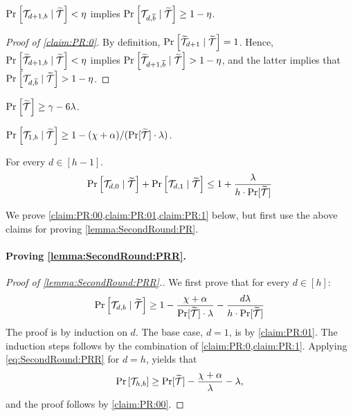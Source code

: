\begin{claim}\label{claim:PR:0}
	$\Pr_{}\left[\mathcal{T}_{d+1,b} \mid {\widetilde{\mathcal{T}}}\right] < \eta$ implies $\Pr_{}\left[\mathcal{T}_{d,\overline{b}} \mid {\widetilde{\mathcal{T}}}\right] \ge 1- \eta$.
\end{claim}
\begin{proof}[Proof of \cref{claim:PR:0}]
By definition, $\Pr_{}\left[{\widetilde{\mathcal{T}}}_{d+1} \mid {\widetilde{\mathcal{T}}}\right] =1$.	 Hence, $\Pr_{}\left[{\widetilde{\mathcal{T}}}_{d+1,b} \mid {\widetilde{\mathcal{T}}}\right]< \eta$ implies $\Pr_{}\left[{\widetilde{\mathcal{T}}}_{d+1,\overline{b}} \mid {\widetilde{\mathcal{T}}}\right]> 1 -\eta$, and the latter implies that $\Pr_{}\left[\mathcal{T}_{d,\overline{b}} \mid {\widetilde{\mathcal{T}}}\right]>  1 -\eta$.
\end{proof}


\begin{claim}\label{claim:PR:00}
$\Pr_{}\left[{\widetilde{\mathcal{T}}}\right] \ge \gamma- 6\lambda$.
\end{claim}


\begin{claim}\label{claim:PR:01}
$\Pr_{}\left[\mathcal{T}_{1,b} \mid {\widetilde{\mathcal{T}}}\right] \ge 1- (\chi + \alpha)/(\Pr[{\widetilde{\mathcal{T}}}]\cdot \lambda)$.
\end{claim}





\begin{claim}\label{claim:PR:1}
For every $d \in [h-1]$.
\[
\Pr_{}\left[\mathcal{T}_{d,0} \mid {\widetilde{\mathcal{T}}}\right] + \Pr_{}\left[\mathcal{T}_{d,1} \mid {\widetilde{\mathcal{T}}}\right] \le 1 + \frac{\lambda}{h\cdot\Pr[{\widetilde{\mathcal{T}}}]}
\]
\end{claim}

We prove \cref{claim:PR:00,claim:PR:01,claim:PR:1} below, but first use the above claims for proving \cref{lemma:SecondRound:PR}.


\paragraph{Proving \cref{lemma:SecondRound:PRR}.}


\begin{proof}[Proof of \cref{lemma:SecondRound:PRR}.]
We first prove that for every $d\in [h]$:
\begin{align}\label{eq:SecondRound:PRR}
\Pr_{}\left[\mathcal{T}_{d,b} \mid {\widetilde{\mathcal{T}}}\right] \ge 1- \frac{ \chi + \alpha}{\Pr[{\widetilde{\mathcal{T}}}]\cdot \lambda} - \frac{d\lambda}{h\cdot\Pr[{\widetilde{\mathcal{T}}}]}
\end{align}	
The proof is by induction on $d$. The base case, $d=1$, is by \cref{claim:PR:01}. The induction steps follows by the combination of \cref{claim:PR:0,claim:PR:1}. Applying \cref{eq:SecondRound:PRR} for $d=h$, yields that
\begin{align*}
\Pr_{}\left[\mathcal{T}_{h,b} \right] \ge \Pr[{\widetilde{\mathcal{T}}}]- \frac{ \chi +\alpha}{\lambda} - \lambda,
\end{align*}	
and the proof follows by \cref{claim:PR:00}.
\end{proof}


